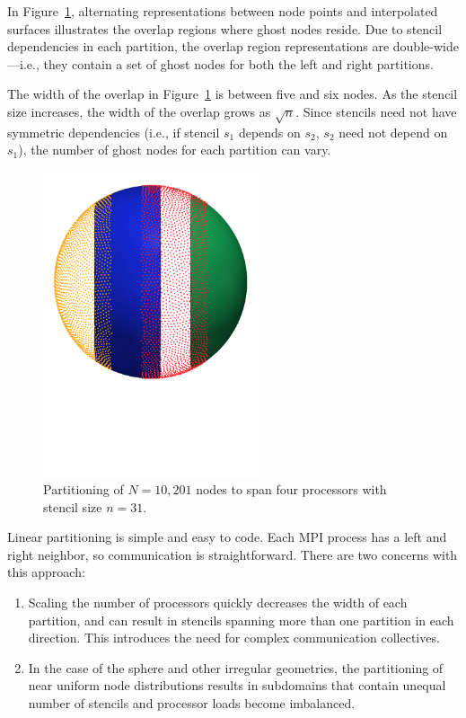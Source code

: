 \documentclass{report}
\begin{document}
In Figure~\ref{fig:decomposed_sphere}, alternating representations between node points and interpolated surfaces illustrates the
overlap regions where ghost nodes reside. Due to stencil dependencies in each partition, the overlap region representations are double-wide---i.e., they contain a set of ghost nodes for both the left and right partitions. 

The width of the overlap in Figure~\ref{fig:decomposed_sphere} is between five and six nodes. As the stencil size increases, the width of the
overlap grows as $\sqrt{n}$. Since stencils need not have symmetric dependencies (i.e., if stencil $s_1$ depends on $s_2$, $s_2$ need not depend on $s_1$), the number of ghost nodes for each partition can vary. 

\begin{figure}[ht!]
\begin{center}
\includegraphics[width=2.5in]{../figures/paper1/figures/vortex_rollup/4procs_N10K_n31.pdf}
\caption{Partitioning of $N=10,201$ nodes to span four processors with stencil size $n=31$. }
\label{fig:decomposed_sphere}
\end{center}
\end{figure}

Linear partitioning is simple and easy to code. Each MPI process has a left and right neighbor, so communication is straightforward. There are two concerns with this approach: 
\begin{enumerate} 
\item Scaling the number of processors quickly decreases the width of each partition, and can result in stencils spanning more than one partition in each direction. This introduces the need for complex communication collectives. 
\item In the case of the sphere and other irregular geometries, the partitioning of near uniform node distributions results in subdomains that contain unequal number of stencils and processor loads become imbalanced. 
\end{enumerate}
\end{document}
